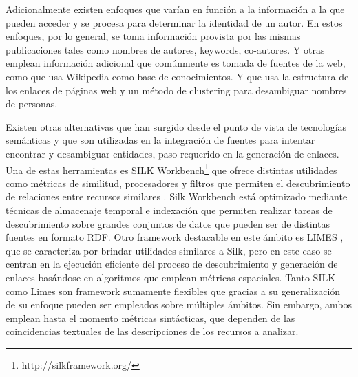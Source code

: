 \documentclass[conference]{IEEEtran}
\begin{document}
Adicionalmente existen enfoques que varían en función a la información a la que pueden acceder y se procesa para determinar la identidad de un autor. En estos enfoques, por lo general, se toma información provista por las mismas publicaciones tales como nombres de autores, keywords, co-autores. Y otras emplean información adicional que comúnmente es tomada de fuentes de la web, como \cite{bunescu2006using} que usa Wikipedia como base de conocimientos. Y \cite{bekkerman2005disambiguating}  que  usa la estructura de los enlaces de páginas web y un método de clustering para desambiguar nombres de personas. 

Existen otras alternativas que han surgido desde el punto de vista de tecnologías semánticas y que son utilizadas en la integración de fuentes para intentar encontrar y desambiguar entidades, paso requerido en la generación de enlaces. Una de estas herramientas es SILK Workbench\footnote{http://silkframework.org/} que ofrece distintas utilidades como métricas de similitud, procesadores y filtros que permiten el descubrimiento de relaciones entre recursos similares \cite{volz2009silk}. Silk Workbench está optimizado mediante técnicas de almacenaje temporal e indexación  que permiten realizar tareas de descubrimiento sobre grandes conjuntos de datos que pueden  ser de distintas fuentes en formato RDF. Otro framework destacable en este ámbito es LIMES \cite{ngomo2011limes}, que se caracteriza por brindar utilidades similares a Silk, pero en este caso se centran en la ejecución eficiente del proceso de descubrimiento y generación de enlaces basándose en algoritmos que emplean métricas espaciales. Tanto  SILK como Limes son framework sumamente flexibles  que gracias a su generalización de su enfoque pueden ser empleados sobre múltiples ámbitos. Sin embargo, ambos emplean hasta el momento métricas sintácticas, que dependen de las coincidencias textuales de las  descripciones de los recursos a analizar.
\end{document}

